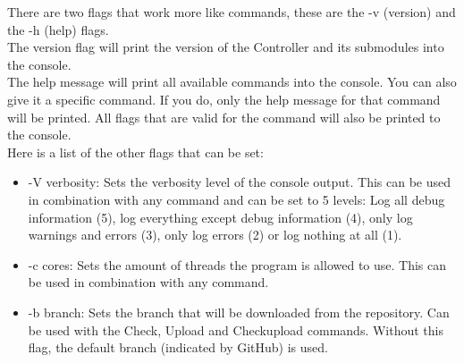 \documentclass[../Main.tex]{subfiles}
\begin{document}
There are two flags that work more like commands, these are the -v (version) and the -h (help) flags.\\
The version flag will print the version of the Controller and its submodules into the console.\\
The help message will print all available commands into the console. You can also give it a specific command. If you do, only the help message for that command will be printed. All flags that are valid for the command will also be printed to the console.\\
Here is a list of the other flags that can be set:
\begin{itemize}
    \item -V verbosity: Sets the verbosity level of the console output. This can be used in combination with any command and can be set to 5 levels: Log all debug information (5), log everything except debug information (4), only log warnings and errors (3), only log errors (2) or log nothing at all (1).
    \item -c cores: Sets the amount of threads the program is allowed to use.  This can be used in combination with any command.
    \item -b branch: Sets the branch that will be downloaded from the repository. Can be used with the Check, Upload and Checkupload commands. Without this flag, the default branch (indicated by GitHub) is used.
\end{itemize}
\end{document}
